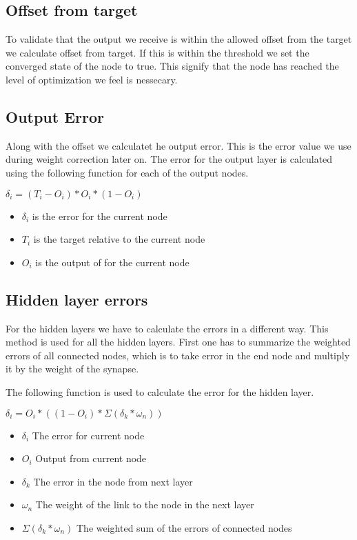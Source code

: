 \subsection{Offset from target}
To validate that the output we receive is within the allowed offset from the
target we calculate offset from target. If this is within the threshold we set
the converged state of the node to true. This signify that the node has reached
the level of optimization we feel is nessecary.

\subsection{Output Error}
Along with the offset we calculatet he output error. This is the error value we
use during weight correction later on.  The error for the output layer is
calculated using the following function for each of the output nodes.

{\large$\delta_i=(T_i-O_i)*O_i*(1-O_i)$}
\begin{itemize}
\item $\delta_i$	is the error for the current node
\item $T_i$				is the target relative to the current node
\item $O_i$					is the output of for the current node
\end{itemize}

\subsection{Hidden layer errors}
For the hidden layers we have to calculate the errors in a different way. This
method is used for all the hidden layers.  First one has to summarize the
weighted errors of all connected nodes, which is to take error in the end node
and multiply it by the weight of the synapse.

The following function is used to calculate the error for the hidden layer.

{\large$\delta_{i}=O_i*((1-O_i)*\Sigma{(\delta_k*\omega_n)})$}
\begin{itemize}
\item $\delta_{i}$ 	The error for current node
\item $O_i$					Output from current node 	
\item $\delta_k$		The error in the node from next layer
\item $\omega_n$		The weight of the link to the node in the next layer
\item $\Sigma{(\delta_k * \omega_n)}$	The weighted sum of the errors of
	connected nodes
\end{itemize}



